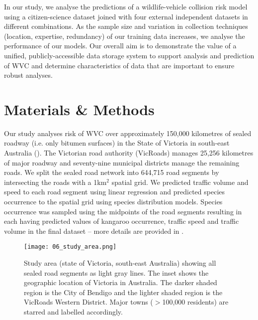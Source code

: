 In our study, we analyse the predictions of a wildlife-vehicle collision risk model using a citizen-science dataset joined with four external independent datasets in different combinations. As the sample size and variation in collection techniques (location, expertise, redundancy) of our training data increases, we analyse the performance of our models. Our overall aim is to demonstrate the value of a unified, publicly-accessible data storage system to support analysis and prediction of WVC and determine characteristics of data that are important to ensure robust analyses.

\section{Materials \& Methods}

Our study analyses risk of WVC over approximately 150,000 kilometres of sealed roadway (i.e. only bitumen surfaces) in the State of Victoria in south-east Australia (). The Victorian road authority (VicRoads) manages 25,256 kilometres of major roadway and seventy-nine municipal districts manage the remaining roads. We split the sealed road network into 644,715 road segments by intersecting the roads with a 1km$^2$ spatial grid. We predicted traffic volume and speed to each road segment using linear regression and predicted species occurrence to the spatial grid using species distribution models. Species occurrence was sampled using the midpoints of the road segments resulting in each having predicted values of kangaroo occurrence, traffic speed and traffic volume in the final dataset -- more details are provided in . 

\begin{figure*}[!t]
  \centering
  \texttt{[image: 06\_study\_area.png]}
  \caption[Study area for model validation]{Study area (state of Victoria, south-east Australia) showing all sealed road segments as light gray lines. The inset shows the geographic location of Victoria in Australia. The darker shaded region is the City of Bendigo and the lighter shaded region is the VicRoads Western District. Major towns ($>$100,000 residents) are starred and labelled accordingly.}
  \label{val_study_area}
\end{figure*}

